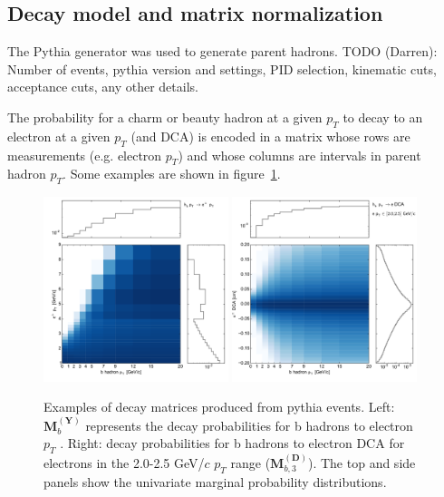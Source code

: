\documentclass[12pt]{article}
\newcommand{\pt}{p_T}
\begin{document}
\subsection{Decay model and matrix normalization}
The Pythia generator was used to generate parent hadrons. TODO (Darren): Number of events, pythia version and settings, PID selection, kinematic cuts, acceptance cuts, any other details.

The probability for a charm or beauty hadron at a given $\pt$ to decay to an electron at a given $\pt$ (and DCA) is encoded in a matrix whose rows are measurements (e.g. electron $\pt$) and whose columns are intervals in parent hadron $\pt$. Some examples are shown in figure~\ref{fig:mat}.
\begin{figure}[tb]
  \begin{center}
    \includegraphics[width=0.48\textwidth]{eptmat_b}
    \quad
    \includegraphics[width=0.48\textwidth]{dcamat_b_2}
  \end{center}
  \caption{Examples of decay matrices produced from pythia events. Left: $\mathbf{M}_{b}^{\mathbf{(Y)}}$ represents the decay probabilities for b hadrons to electron $\pt$ . Right: decay probabilities for b hadrons to electron DCA for electrons in the 2.0-2.5 GeV/$c$ $\pt$ range ($\mathbf{M}_{b,3}^{\mathbf{(D)}}$). The top and side panels show the univariate marginal probability distributions.}
  \label{fig:mat}
\end{figure}
\end{document}
